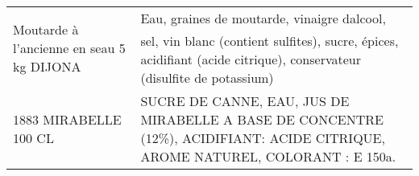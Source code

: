 \begin{longtable}{p{5cm}p{10cm}}
                                                                Moutarde à l'ancienne en seau 5 kg DIJONA &                                                                                                                                                                                                                                                                                                                                                                                                                                                                                                                                                                                                                                                                                                                                                                                                                                                                       Eau, graines de moutarde, vinaigre dalcool, sel, vin blanc (contient sulfites), sucre, épices, acidifiant (acide citrique), conservateur (disulfite de potassium) \\
                                                                                    1883 MIRABELLE 100 CL &                                                                                                                                                                                                                                                                                                                                                                                                                                                                                                                                                                                                                                                                                                                                                                                                                                                                                                           SUCRE DE CANNE, EAU, JUS DE MIRABELLE A BASE DE CONCENTRE (12\%), ACIDIFIANT: ACIDE CITRIQUE, AROME NATUREL, COLORANT : E 150a. \\

\end{longtable}
